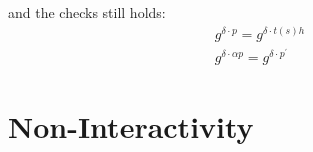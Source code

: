 \documentclass[a4paper,11pt]{article}
\begin{document}
and the checks still holds:
\begin{displaymath}
\begin{split}
g^{\delta \cdot p} = g^{\delta \cdot t(s) h}  \\
g^{\delta \cdot \alpha p} = g^{\delta \cdot p^{'}} 
\end{split}
\end{displaymath}

\section{Non-Interactivity}




\end{document}
